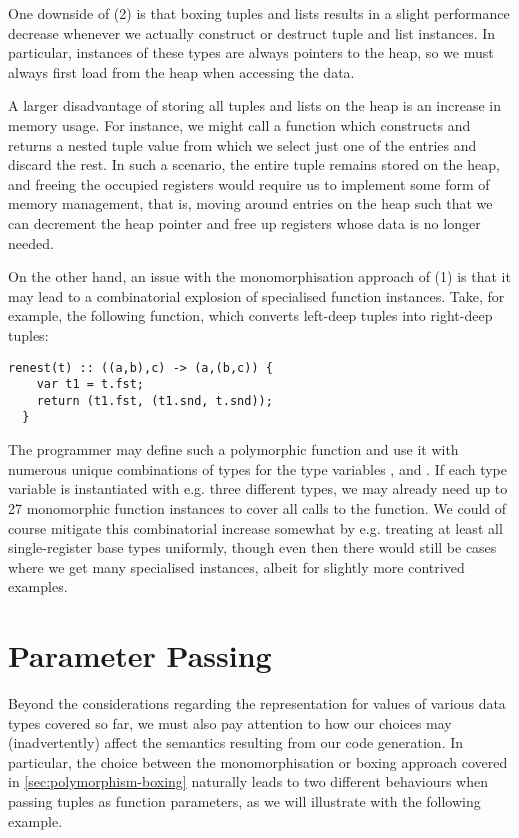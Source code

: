 One downside of (2) is that boxing tuples and lists results in a slight
performance decrease whenever we actually construct or destruct tuple and list
instances. In particular, instances of these types are always pointers to the
heap, so we must always first load from the heap when accessing the data.

A larger disadvantage of storing all tuples and lists on the heap is an increase
in memory usage. For instance, we might call a function which constructs and
returns a nested tuple value from which we select just one of the entries and
discard the rest.
In such a scenario, the entire tuple remains stored on the heap, and freeing the
occupied registers would require us to implement some form of memory management,
that is, moving around entries on the heap such that we can decrement the heap
pointer and free up registers whose data is no longer needed.

On the other hand, an issue with the monomorphisation approach of (1) is that it
may lead to a combinatorial explosion of specialised function instances.
Take, for example, the following function, which converts left-deep tuples into
right-deep tuples:
\begin{lstlisting}[language=spl]
  renest(t) :: ((a,b),c) -> (a,(b,c)) {
    var t1 = t.fst;
    return (t1.fst, (t1.snd, t.snd));
  }
\end{lstlisting}
%
The programmer may define such a polymorphic function and use it with numerous
unique combinations of types for the type variables ,  and
. If each type variable is instantiated with e.g. three different types,
we may already need up to 27 monomorphic function instances to cover all calls
to the  function.
We could of course mitigate this combinatorial increase somewhat by e.g.
treating at least all single-register base types uniformly, though even then
there would still be cases where we get many specialised instances, albeit for
slightly more contrived examples.


\section{Parameter Passing}
Beyond the considerations regarding the representation for values of various
data types covered so far, we must also pay attention to how our choices may
(inadvertently) affect the semantics resulting from our code generation.
In particular, the choice between the monomorphisation or boxing approach
covered in \cref{sec:polymorphism-boxing} naturally leads to two different
behaviours when passing tuples as function parameters, as we will illustrate
with the following example.

